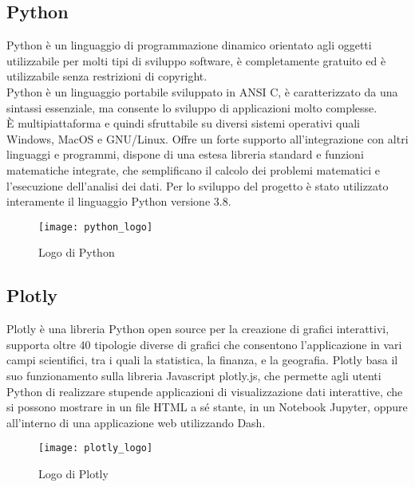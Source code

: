 \subsection{Python}
Python è un linguaggio di programmazione dinamico orientato agli oggetti utilizzabile per molti tipi di sviluppo software, è completamente gratuito ed è utilizzabile senza restrizioni di copyright.\\
Python è un linguaggio portabile sviluppato in ANSI C, è caratterizzato da una sintassi essenziale, ma consente lo sviluppo di applicazioni molto complesse.\\
È multipiattaforma e quindi sfruttabile su diversi sistemi operativi quali Windows, MacOS e GNU/Linux.
Offre un forte supporto all'integrazione con altri linguaggi e programmi, dispone di una estesa libreria standard e funzioni matematiche integrate, che semplificano il calcolo dei problemi matematici e l'esecuzione dell'analisi dei dati.
Per lo sviluppo del progetto è stato utilizzato interamente il linguaggio Python versione 3.8.
\begin{figure}[htp]
    \centering
    \texttt{[image: python\_logo]}
    \caption{Logo di Python}
\end{figure}

\subsection{Plotly}

Plotly è una libreria Python open source  per la creazione di grafici interattivi, supporta oltre 40 tipologie diverse di grafici che consentono l’applicazione in vari campi scientifici, tra i quali la statistica, la finanza, e la geografia.
Plotly basa il suo funzionamento sulla libreria Javascript plotly.js, che permette agli utenti Python di realizzare stupende applicazioni di visualizzazione dati interattive, che si possono mostrare in un file HTML a sé stante, in un Notebook Jupyter\footnotemark, oppure all’interno di una applicazione web utilizzando Dash.

\begin{figure}[htp]
    \centering
    \texttt{[image: plotly\_logo]}
    \caption{Logo di Plotly}
\end{figure}


